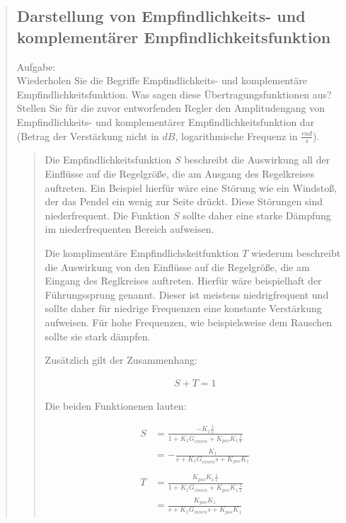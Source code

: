 \begin{quote}
    \subsection{Darstellung von Empfindlichkeits- und komplementärer Empfindlichkeitsfunktion}
    Aufgabe:\\
    Wiederholen Sie die Begriffe Empfindlichkeits- und komplementäre Empfindlichkeitsfunktion. Was sagen diese
    Übertragungsfunktionen aus? Stellen Sie für die zuvor entworfenden Regler den Amplitudengang von Empfindlichkeits-
    und komplementärer Empfindlichkeitsfunktion dar (Betrag der Verstärkung nicht in $dB$, logarithmische Frequenz in
    $\frac{rad}{s}$).
    \begin{quote}
        Die Empfindlichkeitsfunktion $S$ beschreibt die Auswirkung all der Einflüsse auf die Regelgröße, die am Ausgang
        des Regelkreises auftreten. Ein Beispiel hierfür wäre eine Störung wie ein Windstoß, der das
        Pendel ein wenig zur Seite drückt. Diese Störungen sind niederfrequent. Die Funktion $S$ sollte daher eine
        starke Dämpfung im niederfrequenten Bereich aufweisen.\vspace{1em}
        
        Die komplimentäre Empfindlichskeitfunktion $T$ wiederum beschreibt die Auswirkung von den Einflüsse auf die
        Regelgröße, die am Eingang des Reglkreises auftreten. Hierfür wäre beispielhaft der Führungssprung genannt.
        Dieser ist meistens niedrigfrequent und sollte daher für niedrige Frequenzen eine konstante Verstärkung
        aufweisen. Für hohe Frequenzen, wie beispielsweise dem Rauschen sollte sie stark dämpfen.\vspace{1em}
        
        Zusätzlich gilt der Zusammenhang:
        
        \begin{equation*}
        	\begin{split}
        		S + T =1
        	\end{split}
        \end{equation*}
        
        Die beiden Funktionenen lauten:
        
        \begin{equation*}
        	\begin{split}
        		S &= \frac{- K_1 \frac{1}{s}}{1 + K_1 G_{innen} + K_{pos} K_1 \frac{1}{s}}\\
        		&= -\frac{K_1}{s + K_1 G_{innen} s + K_{pos} K_1}\\ \\
        		T &= \frac{K_{pos} K_1 \frac{1}{s}}{1 + K_1 G_{innen} + K_{pos}K_1 \frac{1}{s}}\\
        		&= \frac{K_{pos} K_1}{s + K_1 G_{innen}s + K_{pos}K_1}
        	\end{split}
        \end{equation*}


\end{quote}
\end{quote}
